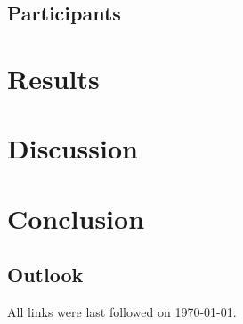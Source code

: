 \documentclass[
  a4paper,  %
  twoside,  %
  bibliography=totoc,
  headsepline,
  cleardoublepage=empty,
  parskip=half,
  draft=false
]{scrbook}
\begin{document}
\section{Participants}

\chapter{Results}

\chapter{Discussion}

\chapter{Conclusion}
\label{sec:zusfas}

\section*{Outlook}

\printbibliography

All links were last followed on \today{}.

\appendix


\pagestyle{empty}
\renewcommand*{\chapterpagestyle}{empty}
\Affirmation
\end{document}
